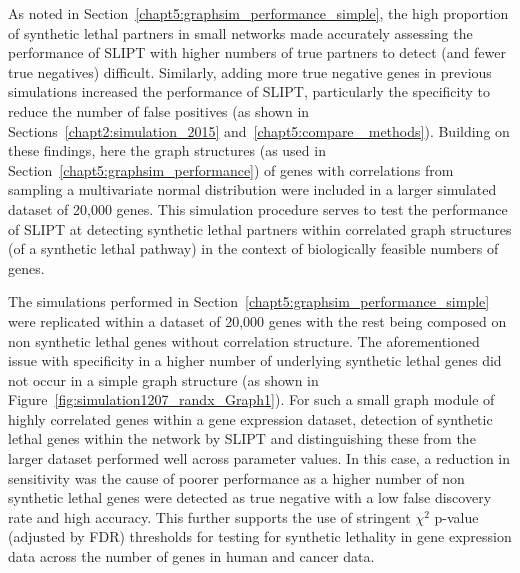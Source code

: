 As noted in Section~\ref{chapt5:graphsim_performance_simple}, the high proportion of synthetic lethal partners in small networks made accurately assessing the performance of \gls{SLIPT} with higher numbers of true partners to detect (and fewer true negatives) difficult. Similarly, adding more true negative genes in previous simulations increased the performance of \gls{SLIPT}, particularly the specificity to reduce the number of false positives (as shown in Sections~\ref{chapt2:simulation_2015} and~\ref{chapt5:compare_ methods}). Building on these findings, here the graph structures (as used in Section~\ref{chapt5:graphsim_performance}) of genes with correlations from sampling a multivariate normal distribution were included in a larger simulated dataset of 20,000 genes. This simulation procedure serves to test the performance of \gls{SLIPT} at detecting synthetic lethal partners within correlated graph structures (of a synthetic lethal pathway) in the context of biologically feasible numbers of genes. 



The simulations performed in Section~\ref{chapt5:graphsim_performance_simple} were replicated within a dataset of 20,000 genes with the rest being composed on non synthetic lethal genes without correlation structure. The aforementioned issue with specificity in a higher number of underlying synthetic lethal genes did not occur in a simple graph structure (as shown in Figure~\ref{fig:simulation1207_randx_Graph1}). For such a small graph module of highly correlated genes within a gene expression dataset, detection of synthetic lethal genes within the network by \gls{SLIPT} and distinguishing these from the larger dataset performed well across parameter values. In this case, a reduction in sensitivity was the cause of poorer performance as a higher number of non synthetic lethal genes were detected as true negative with a low false discovery rate and high accuracy. This further supports the use of stringent $\chi^2$ p-value (adjusted by FDR) thresholds for testing for synthetic lethality in gene expression data across the number of genes in human and cancer data.

